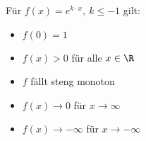 \documentclass[fontsize=9pt, a4paper, landscape, twocolumn]{scrartcl}
\begin{document}
    Für $f(x)=e^{k\cdot x},\ k \leq -1$ gilt:
    \begin{multicols}{2}

        \columnbreak

        \begin{itemize}\itemsep 0pt
            \item $f(0)=1$
            \item $f(x)>0$ für alle $x\in \R$
            \item $f$ fällt steng monoton
            \item $f(x)\to 0$ für $x\to \infty$
            \item $f(x)\to -\infty$ für $x\to -\infty$
        \end{itemize}
    \end{multicols}
\end{document}
